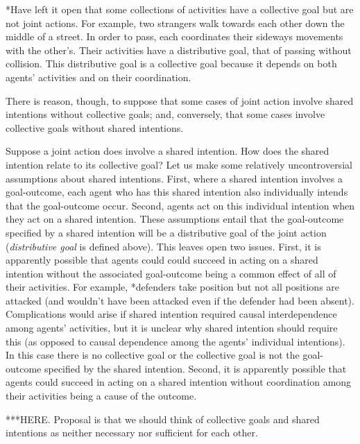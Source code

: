 \documentclass[12pt,a4paper]{extarticle}
\begin{document}
*Have left it open that some collections of activities have a collective goal but are not joint actions.  For example, two strangers walk towards each other down the middle of a street.  In order to pass, each coordinates their sideways movements with the other's.  Their activities have a distributive goal, that of passing without collision.  This distributive goal is a collective goal because it depends on both agents' activities and on their coordination.







There is reason, though, to suppose that some cases of joint action involve shared intentions without collective goals; and, conversely, that some cases involve collective goals without shared intentions.




Suppose a joint action does involve a shared intention.  How does the shared intention relate to its collective goal?  Let us make some relatively uncontroversial assumptions about shared intentions.  
First, where a shared intention involves a goal-outcome, each agent who has this shared intention also individually intends that the goal-outcome occur.  
Second, agents act on this individual intention when they act on a shared intention.  
These assumptions entail that the goal-outcome specified by a shared intention will be a distributive goal of the joint action (\emph{distributive goal} is defined above).
This leaves open two issues.  
First, it is apparently possible that agents could could succeed in acting on a shared intention without the associated goal-outcome being a common effect of all of their activities.  For example, *defenders take position but not all positions are attacked (and wouldn't have been attacked even if the defender had been absent).  Complications would arise if shared intention required causal interdependence among agents' activities, but it is unclear why shared intention should require this (as opposed to causal dependence among the agents' individual intentions).  In this case there is no collective goal or the collective goal is not the goal-outcome specified by the shared intention.
Second, it is apparently possible that agents could succeed in acting on a shared intention without coordination among their activities being a cause of the outcome.

***HERE.  Proposal is that we should think of collective goals and shared intentions as neither necessary nor sufficient for each other.
\end{document}
